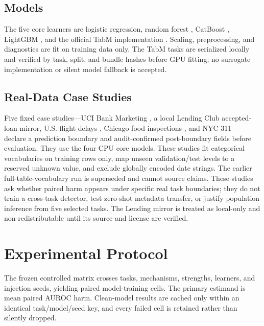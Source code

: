 \documentclass[letterpaper]{article}
\begin{document}
\subsection{Models}
The five core learners are logistic regression, random forest
\citep{breiman2001random}, CatBoost \citep{prokhorenkova2018catboost}, LightGBM
\citep{ke2017lightgbm}, and the official TabM implementation
\citep{gorishniy2025tabm}.  Scaling, preprocessing, and diagnostics are fit on
training data only.  The TabM tasks are serialized locally and verified by task,
split, and bundle hashes before GPU fitting; no surrogate implementation or
silent model fallback is accepted.

\subsection{Real-Data Case Studies}
Five fixed case studies---UCI Bank Marketing \citep{uciBankMarketing}, a local
Lending Club accepted-loan mirror, U.S. flight delays \citep{btsOnTime}, Chicago
food inspections \citep{chicagoFoodInspections}, and NYC 311
\citep{nyc311}---declare a prediction boundary and audit-confirmed post-boundary
fields before evaluation.  They use the four CPU core models.  These studies
fit categorical vocabularies on training rows only, map unseen validation/test
levels to a reserved unknown value, and exclude globally encoded date strings.
The earlier full-table-vocabulary run is superseded and cannot source claims.
These studies
ask whether paired harm appears under specific real task boundaries; they do
not train a cross-task detector, test zero-shot metadata transfer, or justify
population inference from five selected tasks.  The Lending mirror is treated
as local-only and non-redistributable until its source and license are verified.

\section{Experimental Protocol}
\label{sec:protocol}
The frozen controlled matrix crosses \LBControlledTaskCount{} tasks,
\LBMechanismCount{} mechanisms, \LBStrengthCount{} strengths,
\LBCoreModelCount{} learners, and \LBSeedCount{} injection seeds, yielding
\LBExpectedCells{} paired model-training cells.  The primary estimand is mean
paired AUROC harm.  Clean-model results are cached only within an identical
task/model/seed key, and every failed cell is retained rather than silently
dropped.
\end{document}
